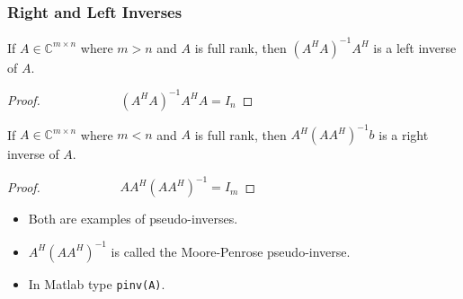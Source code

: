 \documentclass{beamer}
\begin{document}
\begin{frame}\frametitle{Right and Left Inverses}
	\begin{lemma}
		If $A\in\mathbb{C}^{m\times n}$ where $m>n$ and $A$ is full rank, then 	$ (A^HA)^{-1}A^H $ is a left inverse of $A$.
	\end{lemma}
	\begin{proof}
		$\qquad\qquad\qquad (A^HA)^{-1}A^HA = I_n$
	\end{proof}
	\begin{lemma}
		If $A\in\mathbb{C}^{m\times n}$ where $m<n$ and $A$ is full rank, then 	$A^H(AA^H)^{-1}b $ is a right inverse of $A$.
	\end{lemma}
	\begin{proof}
		$\qquad\qquad\qquad AA^H(AA^H)^{-1} = I_m$
	\end{proof}
	
	\begin{itemize}
		\item Both are examples of pseudo-inverses.
		\item $A^H(AA^H)^{-1}$ is called the Moore-Penrose pseudo-inverse.  
		\item In Matlab type \texttt{pinv(A)}.
	\end{itemize}
\end{frame}
\end{document}
